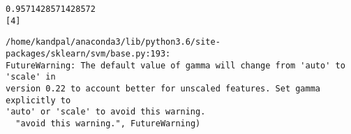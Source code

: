 \documentclass[11pt]{article}
\begin{document}
    \begin{Verbatim}[commandchars=\\\{\}]
0.9571428571428572
[4]
    \end{Verbatim}

    \begin{Verbatim}[commandchars=\\\{\}]
/home/kandpal/anaconda3/lib/python3.6/site-packages/sklearn/svm/base.py:193:
FutureWarning: The default value of gamma will change from 'auto' to 'scale' in
version 0.22 to account better for unscaled features. Set gamma explicitly to
'auto' or 'scale' to avoid this warning.
  "avoid this warning.", FutureWarning)
    \end{Verbatim}


    
    
    
\end{document}
